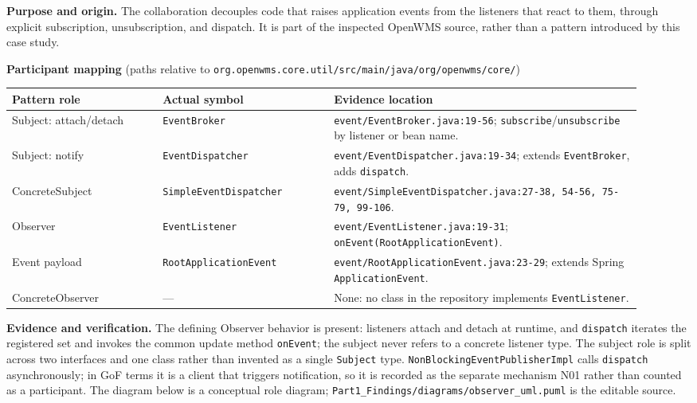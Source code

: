 \documentclass[11pt,a4paper]{article}
\newcommand{\code}[1]{\nolinkurl{#1}}
\begin{document}
\textbf{Purpose and origin.} The collaboration decouples code that raises application events from the listeners that react to them, through explicit subscription, unsubscription, and dispatch. It is part of the inspected OpenWMS source, rather than a pattern introduced by this case study.

\textbf{Participant mapping} (paths relative to \code{org.openwms.core.util/src/main/java/org/openwms/core/})\par\smallskip
\noindent\begin{tabular}{@{}P{0.22\linewidth}P{0.25\linewidth}P{0.45\linewidth}@{}}
\toprule
Pattern role & Actual symbol & Evidence location\\
\midrule
Subject: attach/detach & \code{EventBroker} & \code{event/EventBroker.java:19-56}; \code{subscribe}/\code{unsubscribe} by listener or bean name.\\
Subject: notify & \code{EventDispatcher} & \code{event/EventDispatcher.java:19-34}; extends \code{EventBroker}, adds \code{dispatch}.\\
ConcreteSubject & \code{SimpleEventDispatcher} & \code{event/SimpleEventDispatcher.java:27-38, 54-56, 75-79, 99-106}.\\
Observer & \code{EventListener} & \code{event/EventListener.java:19-31}; \code{onEvent(RootApplicationEvent)}.\\
Event payload & \code{RootApplicationEvent} & \code{event/RootApplicationEvent.java:23-29}; extends Spring \code{ApplicationEvent}.\\
ConcreteObserver & --- & None: no class in the repository implements \code{EventListener}.\\
\bottomrule
\end{tabular}

\textbf{Evidence and verification.} The defining Observer behavior is present: listeners attach and detach at runtime, and \code{dispatch} iterates the registered set and invokes the common update method \code{onEvent}; the subject never refers to a concrete listener type. The subject role is split across two interfaces and one class rather than invented as a single \code{Subject} type. \code{NonBlockingEventPublisherImpl} calls \code{dispatch} asynchronously; in GoF terms it is a client that triggers notification, so it is recorded as the separate mechanism N01 rather than counted as a participant. The diagram below is a conceptual role diagram; \code{Part1_Findings/diagrams/observer_uml.puml} is the editable source.
\end{document}
